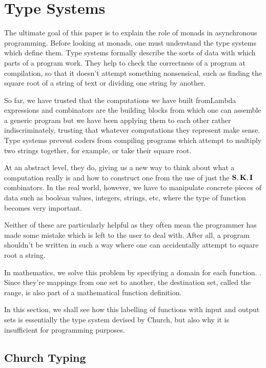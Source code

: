\newcommand\ra{\rightarrow}
\section{Type Systems}

The ultimate goal of this paper is to explain the role of monads in asynchronous programming. Before looking at monads, one must understand the type systems which define them. Type systems formally describe the sorts of data with which parts of a program work. They help to check the correctness of a program at compilation, so that it doesn't attempt something nonsensical, such as finding the square root of a string of text or dividing one string by another.

So far, we have trusted that the computations we have built fromLambda expressions and combinators are the building blocks from which one can assemble a generic program but we have been applying them to each other rather indiscriminately, trusting that whatever computations they represent make sense. Type systems prevent coders from compiling programs which attempt to multiply two strings together, for example, or take their square root.

At an abstract level, they do, giving us a new way to think about what a computation really is and how to construct one from the use of just the $\textbf S, \textbf K, \textbf I$ combinators. In the real world, however, we have to manipulate concrete pieces of data such as boolean values, integers, strings, etc, where the type of function becomes very important. 

Neither of these are particularly helpful as they often mean the programmer has made some mistake which is left to the user to deal with. After all, a program shouldn't be written in such a way where one can accidentally attempt to square root a string.

In mathematics, we solve this problem by specifying a domain for each function. . Since they're mappings from one set to another, the destination set, called the range, is also part of a mathematical function definition.

In this section, we shall see how this labelling of functions with input and output sets is essentially the type system devised by Church\cite{LambdaAndCombinatorsIntro}, but also why it is insufficient for programming purposes.

\subsection{Church Typing}

